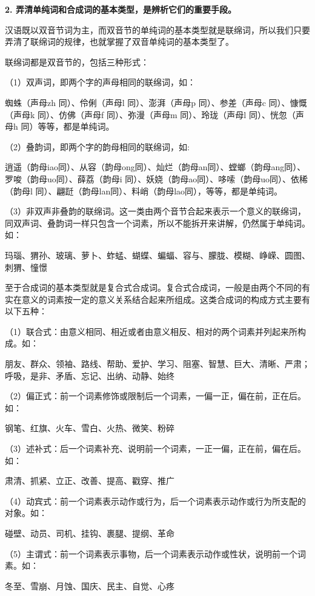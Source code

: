 \textbf{2. 弄清单纯词和合成词的基本类型，是辨析它们的重要手段。}

汉语既以双音节词为主，而双音节的单纯词的基本类型就是联绵词，所以我们只要弄清了联绵词的规律，也就掌握了双音单纯词的基本类型了。

联绵词都是双音节的，包括三种形式：

（1）双声词，即两个字的声母相同的联绵词，如：

蜘蛛（声母zh 同）、伶俐（声母l 同）、澎湃（声母p 同）、参差（声母c 同）、慷慨（声母k 同）、仿佛（声母f 同）、弥漫（声母m 同）、玲珑（声母l 同）、恍忽（声母h 同）等等，都是单纯词。

（2）叠韵词，即两个字的韵母相同的联绵词，如:

逍遥（韵母iao同）、从容（韵母ong同）、灿烂（韵母an同）、螳螂（韵母ang同）、罗唆（韵母uo同）、薛荔（韵母i 同）、妖娆（韵母ao同）、哆嗦（韵母uo同）、依稀（韵母l 同）、翩跹（韵母lan同）、料峭（韵母lao同），等等，都是单纯词。

（3）非双声非叠韵的联绵词。这一类由两个音节合起来表示一个意义的联绵词，同双声词、叠韵词一样只包含一个词素，所以不能拆开来讲解，仍然属于单纯词。如：

玛瑙、猬孙、玻璃、萝卜、蚱蜢、蝴蝶、蝙蝠、容与、朦胧、模糊、峥嵘、圆图、刺猬、憧憬

至于合成词的基本类型就是复合式合成词。复合式合成词，一般是由两个不同的有实在意义的词素按一定的意义关系结合起来所组成。这类合成词的构成方式主要有以下五种：

（1）联合式：由意义相同、相近或者由意义相反、相对的两个词素并列起来所构成。如：

朋友、群众、领袖、路线、帮助、爱护、学习、阻塞、智慧、巨大、清晰、严肃；呼吸，是非、矛盾、忘记、出纳、动静、始终
\newpage

（2）偏正式：前一个词素修饰或限制后一个词素，一偏一正，偏在前，正在后。如：

钢笔、红旗、火车、雪白、火热、微笑、粉碎

（3）述补式：后一个词素补充、说明前一个词素，一正一偏，正在前，偏在后。如：

肃清、抓紧、立正、改善、提高、戳穿、推广

（4）动宾式：前一个词素表示动作或行为，后一个词素表示动作或行为所支配的对象。如：

碰壁、动员、司机、挂钩、裹腿、提纲、革命

（5）主谓式：前一个词素表示事物，后一个词素表示动作或性状，说明前一个词素。如：

冬至、雪崩、月蚀、国庆、民主、自觉、心疼

